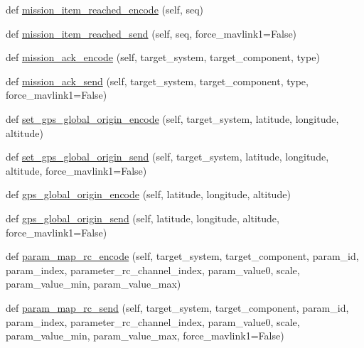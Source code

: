 \begin{DoxyCompactItemize}
\item 
def \hyperlink{classpymavlink_1_1dialects_1_1v10_1_1MAVLink_a9e6deb675dcc78a8d1ed7216d567fc8b}{mission\+\_\+item\+\_\+reached\+\_\+encode} (self, seq)
\item 
def \hyperlink{classpymavlink_1_1dialects_1_1v10_1_1MAVLink_a7d9d551582097bfd16a04bd0f602ddfc}{mission\+\_\+item\+\_\+reached\+\_\+send} (self, seq, force\+\_\+mavlink1=False)
\item 
def \hyperlink{classpymavlink_1_1dialects_1_1v10_1_1MAVLink_a398accca2114b19f54f2b9fb7be54774}{mission\+\_\+ack\+\_\+encode} (self, target\+\_\+system, target\+\_\+component, type)
\item 
def \hyperlink{classpymavlink_1_1dialects_1_1v10_1_1MAVLink_a18ee07bc83531c8c1eb8eb702790ec13}{mission\+\_\+ack\+\_\+send} (self, target\+\_\+system, target\+\_\+component, type, force\+\_\+mavlink1=False)
\item 
def \hyperlink{classpymavlink_1_1dialects_1_1v10_1_1MAVLink_a2357a4ea9db22e91fd2a5e3a4736f809}{set\+\_\+gps\+\_\+global\+\_\+origin\+\_\+encode} (self, target\+\_\+system, latitude, longitude, altitude)
\item 
def \hyperlink{classpymavlink_1_1dialects_1_1v10_1_1MAVLink_a4b849b41fd5d1a7b0a194a93832071ba}{set\+\_\+gps\+\_\+global\+\_\+origin\+\_\+send} (self, target\+\_\+system, latitude, longitude, altitude, force\+\_\+mavlink1=False)
\item 
def \hyperlink{classpymavlink_1_1dialects_1_1v10_1_1MAVLink_a9f147a41073aaf2334e0d2d7d564bc63}{gps\+\_\+global\+\_\+origin\+\_\+encode} (self, latitude, longitude, altitude)
\item 
def \hyperlink{classpymavlink_1_1dialects_1_1v10_1_1MAVLink_a63102f06f0ba7d9d1b81d5716125019f}{gps\+\_\+global\+\_\+origin\+\_\+send} (self, latitude, longitude, altitude, force\+\_\+mavlink1=False)
\item 
def \hyperlink{classpymavlink_1_1dialects_1_1v10_1_1MAVLink_aeaa52a90f587891cf4510eb63f827ada}{param\+\_\+map\+\_\+rc\+\_\+encode} (self, target\+\_\+system, target\+\_\+component, param\+\_\+id, param\+\_\+index, parameter\+\_\+rc\+\_\+channel\+\_\+index, param\+\_\+value0, scale, param\+\_\+value\+\_\+min, param\+\_\+value\+\_\+max)
\item 
def \hyperlink{classpymavlink_1_1dialects_1_1v10_1_1MAVLink_acfbb09f44567ac1abfc65b2ce0761c3b}{param\+\_\+map\+\_\+rc\+\_\+send} (self, target\+\_\+system, target\+\_\+component, param\+\_\+id, param\+\_\+index, parameter\+\_\+rc\+\_\+channel\+\_\+index, param\+\_\+value0, scale, param\+\_\+value\+\_\+min, param\+\_\+value\+\_\+max, force\+\_\+mavlink1=False)

\end{DoxyCompactItemize}
